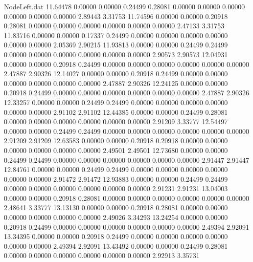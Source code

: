 \begin{filecontents}{NodeLeft.dat}
  11.64478    0.00000    0.00000     0.24499    0.28081    0.00000    0.00000    0.00000    0.00000    0.00000    0.00000    2.89443    3.31753
  11.74596    0.00000    0.00000     0.20918    0.28081    0.00000    0.00000    0.00000    0.00000    0.00000    0.00000    2.47133    3.31753
  11.83716    0.00000    0.00000     0.17337    0.24499    0.00000    0.00000    0.00000    0.00000    0.00000    0.00000    2.05369    2.90215
  11.93813    0.00000    0.00000     0.24499    0.24499    0.00000    0.00000    0.00000    0.00000    0.00000    0.00000    2.90573    2.90573
  12.04931    0.00000    0.00000     0.20918    0.24499    0.00000    0.00000    0.00000    0.00000    0.00000    0.00000    2.47887    2.90326
  12.14027    0.00000    0.00000     0.20918    0.24499    0.00000    0.00000    0.00000    0.00000    0.00000    0.00000    2.47887    2.90326
  12.24125    0.00000    0.00000     0.20918    0.24499    0.00000    0.00000    0.00000    0.00000    0.00000    0.00000    2.47887    2.90326
  12.33257    0.00000    0.00000     0.24499    0.24499    0.00000    0.00000    0.00000    0.00000    0.00000    0.00000    2.91102    2.91102
  12.44385    0.00000    0.00000     0.24499    0.28081    0.00000    0.00000    0.00000    0.00000    0.00000    0.00000    2.91209    3.33777
  12.54497    0.00000    0.00000     0.24499    0.24499    0.00000    0.00000    0.00000    0.00000    0.00000    0.00000    2.91209    2.91209
  12.63583    0.00000    0.00000     0.20918    0.20918    0.00000    0.00000    0.00000    0.00000    0.00000    0.00000    2.49501    2.49501
  12.73680    0.00000    0.00000     0.24499    0.24499    0.00000    0.00000    0.00000    0.00000    0.00000    0.00000    2.91447    2.91447
  12.84761    0.00000    0.00000     0.24499    0.24499    0.00000    0.00000    0.00000    0.00000    0.00000    0.00000    2.91472    2.91472
  12.93883    0.00000    0.00000     0.24499    0.24499    0.00000    0.00000    0.00000    0.00000    0.00000    0.00000    2.91231    2.91231
  13.04003    0.00000    0.00000     0.20918    0.28081    0.00000    0.00000    0.00000    0.00000    0.00000    0.00000    2.48641    3.33777
  13.13130    0.00000    0.00000     0.20918    0.28081    0.00000    0.00000    0.00000    0.00000    0.00000    0.00000    2.49026    3.34293
  13.24254    0.00000    0.00000     0.20918    0.24499    0.00000    0.00000    0.00000    0.00000    0.00000    0.00000    2.49394    2.92091
  13.34395    0.00000    0.00000     0.20918    0.24499    0.00000    0.00000    0.00000    0.00000    0.00000    0.00000    2.49394    2.92091
  13.43492    0.00000    0.00000     0.24499    0.28081    0.00000    0.00000    0.00000    0.00000    0.00000    0.00000    2.92913    3.35731

\end{filecontents}
